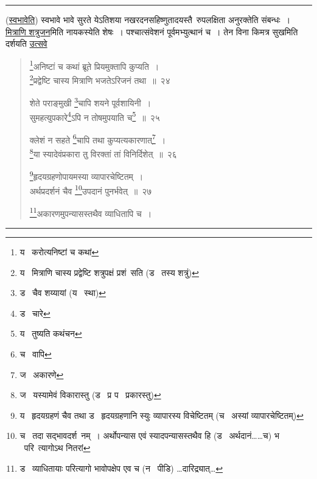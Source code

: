 \documentclass[11pt, openany]{book}
\begin{document}
\hrule

\vspace{2mm}
(\underline{स्वभावेति}) स्वभावे भावे सुरते येऽतिशया नखरदनसहिष्णुतादयस्तै\textendash\ रुपलक्षिता अनुरक्तेति संबन्धः~। \underline{मित्राणि शत्रुजन}मिति नायकस्येति शेषः~। पश्चात्संवेशनं पूर्वमभ्युत्थानं च~। तेन विना किमत्र सुखमिति दर्शयति \underline{उत्सवे}

\newpage

\begin{quote}
{\na \renewcommand{\thefootnote}{1}\footnote{य \textendash\  करोत्यनिष्टां च कथां}अनिष्टां च कथां ब्रूते प्रियमुक्तापि कुप्यति~।\\
\renewcommand{\thefootnote}{2}\footnote{य \textendash\  मित्राणि चास्य प्रद्वेष्टि शत्रुपक्षं प्रशं\textendash\ सति (ड \textendash\  तस्य शत्रुं)}प्रद्वेष्टि चास्य मित्राणि भजतेऽरिजनं तथा~॥~२४

शेते पराङ्मुखी \renewcommand{\thefootnote}{3}\footnote{ड \textendash\  चैव शय्यायां (य \textendash\  स्था)}चापि शयने पूर्वशायिनी~।\\
सुमहत्युपकारे\renewcommand{\thefootnote}{4}\footnote{ड \textendash\  चारे}ऽपि न तोषमुपयाति च\renewcommand{\thefootnote}{5}\footnote{य \textendash\  तुष्यति कथंचन}~॥~२५

क्लेशं न सहते \renewcommand{\thefootnote}{6}\footnote{च \textendash\  वापि}चापि तथा कुप्यत्यकारणात्\renewcommand{\thefootnote}{7}\footnote{ज \textendash\  अकारणे}~।\\
\renewcommand{\thefootnote}{8}\footnote{ज \textendash\  यस्यामेवं विकारास्तु (ड \textendash\  प्र प \textendash\  प्रकारस्तु)}या स्यादेवंप्रकारा तु विरक्तां तां विनिर्दिशेत्~॥~२६

\renewcommand{\thefootnote}{9}\footnote{य \textendash\  हृदयग्रहणं चैव तथा ड \textendash\  हृदयग्रहणानि स्युः व्यापारस्य विचेष्टितम् (च \textendash\  अस्यां व्यापारचेष्टितम्)}हृदयग्रहणोपायमस्या व्यापारचेष्टितम्~।\\
अर्थप्रदर्शनं चैव \renewcommand{\thefootnote}{10}\footnote{च \textendash\  तदा सद्भावदर्श\textendash\ नम्~। अर्थोपन्यास एवं स्यादपन्यासस्तथैव हि (ड \textendash\  अर्थदानं\ldots \ldots च) भ \textendash\  परि\textendash\ त्यागोऽथ नितरां}उपदानं पुनर्भवेत्~॥~२७

\renewcommand{\thefootnote}{11}\footnote{ड \textendash\  व्याधितायाः परित्यागो भावोपक्षेप एव च (न \textendash\  पीडि) \ldots दारिद्र्यात्\ldots }अकारणमुपन्यासस्तथैव व्याधितापि च~।}
\end{quote}

\hrule
\end{document}
